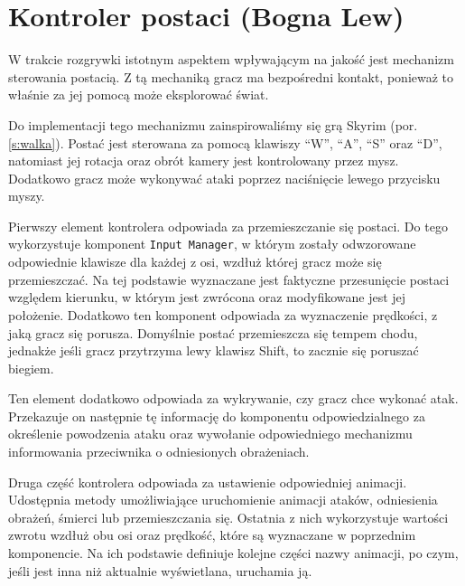 \section{Kontroler postaci (Bogna Lew)}\label{s:por_impl}
W trakcie rozgrywki istotnym aspektem wpływającym na jakość jest mechanizm sterowania postacią. Z tą mechaniką gracz ma
bezpośredni kontakt, ponieważ to właśnie za jej pomocą może eksplorować świat.

Do implementacji tego mechanizmu zainspirowaliśmy się grą Skyrim (por. \ref{s:walka}). Postać jest sterowana za pomocą klawiszy “W”, “A”, “S”
oraz “D”, natomiast jej rotacja oraz obrót kamery jest kontrolowany przez mysz. Dodatkowo gracz może wykonywać ataki
poprzez naciśnięcie lewego przycisku myszy.

Pierwszy element kontrolera odpowiada za przemieszczanie się postaci. Do tego wykorzystuje komponent \texttt{Input Manager}, w
którym zostały odwzorowane odpowiednie klawisze dla każdej z osi, wzdłuż której gracz może się przemieszczać. Na tej
podstawie wyznaczane jest faktyczne przesunięcie postaci względem kierunku, w którym jest zwrócona oraz modyfikowane
jest jej położenie. Dodatkowo ten komponent odpowiada za wyznaczenie prędkości, z jaką gracz się porusza. Domyślnie
postać przemieszcza się tempem chodu, jednakże jeśli gracz przytrzyma lewy klawisz Shift, to zacznie się poruszać biegiem.

Ten element dodatkowo odpowiada za wykrywanie, czy gracz chce wykonać atak. Przekazuje on następnie tę informację do
komponentu odpowiedzialnego za określenie powodzenia ataku oraz wywołanie odpowiedniego mechanizmu informowania
przeciwnika o odniesionych obrażeniach.

Druga część kontrolera odpowiada za ustawienie odpowiedniej animacji. Udostępnia metody umożliwiające uruchomienie
animacji ataków, odniesienia obrażeń, śmierci lub przemieszczania się. Ostatnia z nich wykorzystuje wartości zwrotu wzdłuż
obu osi oraz prędkość, które są wyznaczane w poprzednim komponencie. Na ich podstawie definiuje kolejne części nazwy
animacji, po czym, jeśli jest inna niż aktualnie wyświetlana, uruchamia ją.

